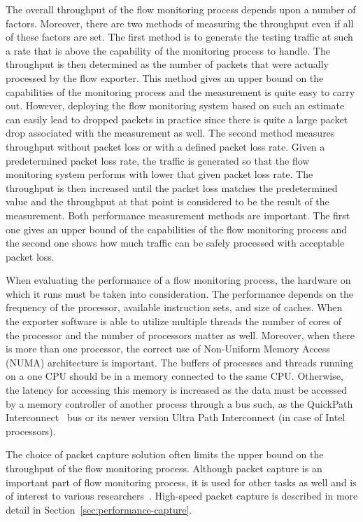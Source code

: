 The overall throughput of the flow monitoring process depends upon a number of factors. Moreover, there are two methods of measuring the throughput even if all of these factors are set. The first method is to generate the testing traffic at such a rate that is above the capability of the monitoring process to handle. The throughput is then determined as the number of packets that were actually processed by the flow exporter. This method gives an upper bound on the capabilities of the monitoring process and the measurement is quite easy to carry out. However, deploying the flow monitoring system based on such an estimate can easily lead to dropped packets in practice since there is quite a large packet drop associated with the measurement as well. The second method measures throughput without packet loss or with a defined packet loss rate. Given a predetermined packet loss rate, the traffic is generated so that the flow monitoring system performs with lower that given packet loss rate. The throughput is then increased until the packet loss matches the predetermined value and the throughput at that point is considered to be the result of the measurement. Both performance measurement methods are important. The first one gives an upper bound of the capabilities of the flow monitoring process and the second one shows how much traffic can be safely processed with acceptable packet loss.

When evaluating the performance of a flow monitoring process, the hardware on which it runs must be taken into consideration. The performance depends on the frequency of the processor, available instruction sets, and size of caches. When the exporter software is able to utilize multiple threads the number of cores of the processor and the number of processors matter as well. Moreover, when there is more than one processor, the correct use of Non-Uniform Memory Access (NUMA) architecture is important. The buffers of processes and threads running on a one CPU should be in a memory connected to the same CPU. Otherwise, the latency for accessing this memory is increased as the data must be accessed by a memory controller of another process through a bus such, as the QuickPath Interconnect~\cite{IntelCorporation-2009-Introduction} bus or its newer version Ultra Path Interconnect (in case of Intel processors).

The choice of packet capture solution often limits the upper bound on the throughput of the flow monitoring process. Although packet capture is an important part of flow monitoring process, it is used for other tasks as well and is of interest to various researchers~\cite{Garcia-Dorado-2013-High, Nassopulos-2014-Flow}. High-speed packet capture is described in more detail in Section~\ref{sec:performance-capture}.


